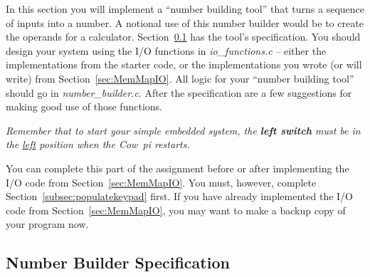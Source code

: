 In this section you will implement a ``number building tool'' that turns a sequence of inputs into a number.
A notional use of this number builder would be to create the operands for a calculator.
Section~\ref{subsec:functionalspecification} has the tool's specification.
You should design your system using the I/O functions in \textit{io\_functions.c} -- either the implementations from the starter code, or the implementations you wrote (or will write) from Section~\ref{sec:MemMapIO}.
All logic for your ``number building tool'' should go in \textit{number\_builder.c}.
After the specification are a few suggestions for making good use of those functions.

\textit{Remember that to start your simple embedded system, the \textbf{left switch} must be in the \underline{left} position when the Cow~pi restarts.}

You can complete this part of the assignment before or after implementing the I/O code from Section~\ref{sec:MemMapIO}.
You must, however, complete Section~\ref{subsec:populatekeypad} first.
If you have already implemented the I/O code from Section~\ref{sec:MemMapIO}, you may want to make a backup copy of your program now.


\subsection{Number Builder Specification} \label{subsec:functionalspecification}

